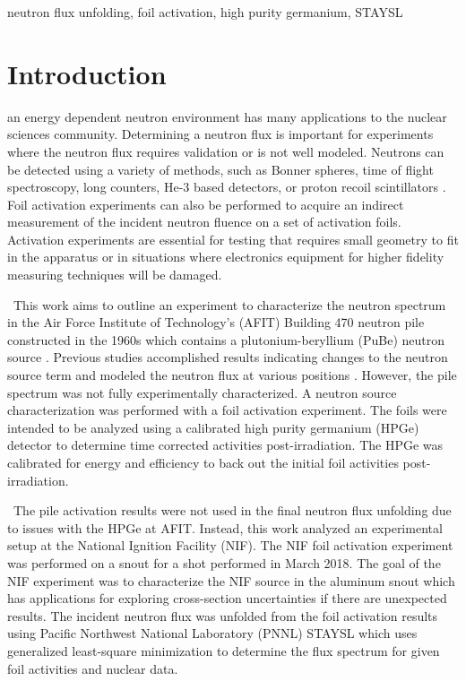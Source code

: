 \documentclass[journal]{IEEEtran}
\begin{document}
	\begin{IEEEkeywords}
		neutron flux unfolding, foil activation, high purity germanium, STAYSL 
	\end{IEEEkeywords}
	
	\IEEEpeerreviewmaketitle
	
\section{Introduction}
 an energy dependent neutron environment has many applications to the nuclear sciences community. Determining a neutron flux is important for experiments where the neutron flux requires validation or is not well modeled. Neutrons can be detected using a variety of methods, such as Bonner spheres, time of flight spectroscopy, long counters, He-3 based detectors, or proton recoil scintillators \cite{Knoll}. Foil activation experiments can also be performed to acquire an indirect measurement of the incident neutron fluence on a set of activation foils. Activation experiments are essential for testing that requires small geometry to fit in the apparatus or in situations where electronics equipment for higher fidelity measuring techniques will be damaged. 

\ This work aims to outline an experiment to characterize the neutron spectrum in the Air Force Institute of Technology's (AFIT) Building 470 neutron pile constructed in the 1960s which contains a plutonium-beryllium (PuBe) neutron source \cite{NETF}. Previous studies accomplished results indicating changes to the neutron source term and modeled the neutron flux at various positions \cite{Bevins,Will}. However, the pile spectrum was not fully experimentally characterized. A neutron source characterization was performed with a foil activation experiment. The foils were intended to be analyzed using a calibrated high purity germanium (HPGe) detector to determine time corrected activities post-irradiation. The HPGe was calibrated for energy and efficiency to back out the initial foil activities post-irradiation. 

\ The pile activation results were not used in the final neutron flux unfolding due to issues with the HPGe at AFIT. Instead, this work analyzed an experimental setup at the National Ignition Facility (NIF). The NIF foil activation experiment was performed on a snout for a shot performed in March 2018\cite{Bogetic}. The goal of the NIF experiment was to characterize the NIF source in the aluminum snout which has applications for exploring cross-section uncertainties if there are unexpected results. The incident neutron flux was unfolded from the foil activation results using Pacific Northwest National Laboratory (PNNL) STAYSL which uses generalized least-square minimization to determine the flux spectrum for given foil activities and nuclear data\cite{STAYSL}.
\end{document}
